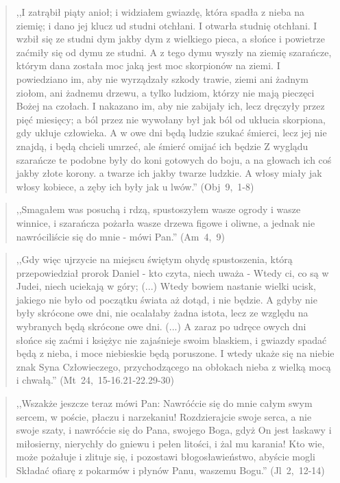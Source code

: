 \documentclass[10pt,a4paper,oneside]{article}
\begin{document}
\begin{quote}
,,I zatrąbił piąty anioł; i widziałem gwiazdę, która spadła z nieba na ziemię; i dano jej klucz ud studni otchłani. I otwarła studnię otchłani. I wzbił się ze studni dym jakby dym z wielkiego pieca, a słońce i powietrze zaćmiły się od dymu ze studni. A z tego dymu wyszły na ziemię szarańcze, którym dana została moc jaką jest moc skorpionów na ziemi. I powiedziano im, aby nie wyrządzały szkody trawie, ziemi ani żadnym ziołom, ani żadnemu drzewu, a tylko ludziom, którzy nie mają pieczęci Bożej na czołach. I nakazano im, aby nie zabijały ich, lecz dręczyły przez pięć miesięcy; a ból przez nie wywołany był jak ból od ukłucia skorpiona, gdy ukłuje człowieka. A w owe dni będą ludzie szukać śmierci, lecz jej nie znajdą, i będą chcieli umrzeć, ale śmierć omijać ich będzie Z wyglądu szarańcze te podobne były do koni gotowych do boju, a na głowach ich coś jakby złote korony. a twarze ich jakby twarze ludzkie. A włosy miały jak włosy kobiece, a zęby ich były jak u lwów.'' (Obj~9,~1-8)
\end{quote}
\begin{quote}
,,Smagałem was posuchą i rdzą, spustoszyłem wasze ogrody i wasze winnice, i szarańcza pożarła wasze drzewa figowe i oliwne, a jednak nie nawróciliście się do mnie - mówi Pan.'' (Am~4,~9)
\end{quote}
\begin{quote}
,,Gdy więc ujrzycie na miejscu świętym ohydę spustoszenia, którą przepowiedział prorok Daniel - kto czyta, niech uważa - Wtedy ci, co są w Judei, niech uciekają w góry; (...) Wtedy bowiem nastanie wielki ucisk, jakiego nie było od początku świata aż dotąd, i nie będzie. A gdyby nie były skrócone owe dni, nie ocalałaby żadna istota, lecz ze względu na wybranych będą skrócone owe dni. (...) A zaraz po udręce owych dni słońce się zaćmi i księżyc nie zajaśnieje swoim blaskiem, i gwiazdy spadać będą z nieba, i moce niebieskie będą poruszone. I wtedy ukaże się na niebie znak Syna Człowieczego, przychodzącego na obłokach nieba z wielką mocą i chwałą.'' (Mt~24,~15-16.21-22.29-30)
\end{quote}
\begin{quote}
,,Wszakże jeszcze teraz mówi Pan: Nawróćcie się do mnie całym swym sercem, w poście, płaczu i narzekaniu! Rozdzierajcie swoje serca, a nie swoje szaty, i nawróćcie się do Pana, swojego Boga, gdyż On jest łaskawy i miłosierny, nierychły do gniewu i pełen litości, i żal mu karania! Kto wie, może pożałuje i zlituje się, i pozostawi błogosławieństwo, abyście mogli Składać ofiarę z pokarmów i płynów Panu, waszemu Bogu.'' (Jl~2,~12-14)
\end{quote}
\end{document}
